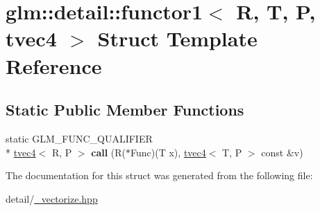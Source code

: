 \hypertarget{structglm_1_1detail_1_1functor1_3_01R_00_01T_00_01P_00_01tvec4_01_4}{\section{glm\-:\-:detail\-:\-:functor1$<$ R, T, P, tvec4 $>$ Struct Template Reference}
\label{structglm_1_1detail_1_1functor1_3_01R_00_01T_00_01P_00_01tvec4_01_4}
}
\subsection*{Static Public Member Functions}
\begin{DoxyCompactItemize}
\item 
\hypertarget{structglm_1_1detail_1_1functor1_3_01R_00_01T_00_01P_00_01tvec4_01_4_a65634749e4ae6e35d4cc898481d4681f}{static G\-L\-M\-\_\-\-F\-U\-N\-C\-\_\-\-Q\-U\-A\-L\-I\-F\-I\-E\-R \\*
\hyperlink{structglm_1_1tvec4}{tvec4}$<$ R, P $>$ {\bfseries call} (R($\ast$Func)(T x), \hyperlink{structglm_1_1tvec4}{tvec4}$<$ T, P $>$ const \&v)}\label{structglm_1_1detail_1_1functor1_3_01R_00_01T_00_01P_00_01tvec4_01_4_a65634749e4ae6e35d4cc898481d4681f}

\end{DoxyCompactItemize}


The documentation for this struct was generated from the following file\-:\begin{DoxyCompactItemize}
\item 
detail/\hyperlink{__vectorize_8hpp}{\-\_\-vectorize.\-hpp}\end{DoxyCompactItemize}
